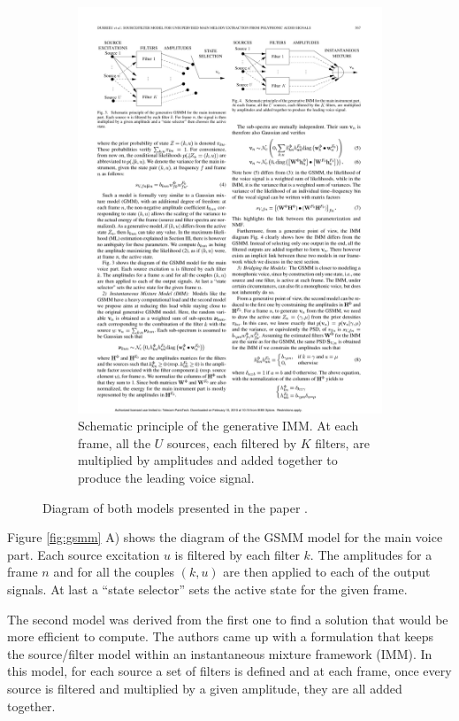 \begin{figure}[b]
\begin{subfigure}[b]{0.48\textwidth}
                \includegraphics[width=\textwidth]{Figures/imm}
                \caption{Schematic principle of the generative IMM. At each frame, all the $U$ sources, each filtered by $K$ filters, are multiplied by amplitudes and added together to produce the leading voice signal.}
                \label{fig:imm}
        \end{subfigure}
          \caption{Diagram of both models presented in the paper \cite{durrieu}.}
        \label{fig:gsmmimm}
\end{figure}

Figure \ref{fig:gsmm}  A) shows the diagram of the GSMM model for the main voice part. Each source excitation $u$ is filtered by each filter $k$. The amplitudes for a frame $n$ and for all the couples $(k, u)$ are then applied to each of the output signals. At last a ``state selector'' sets the active state for the given frame.

The second model was derived from the first one to find a solution that would be more efficient to compute. The authors came up with a formulation that keeps the source/filter model within an instantaneous mixture framework (IMM). In this model, for each source a set of filters is defined and at each frame, once every source is filtered and multiplied by a given amplitude, they are all added together.

